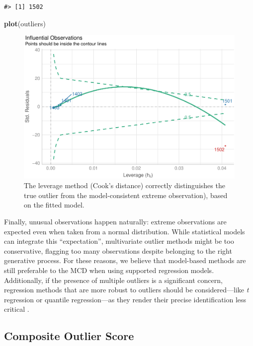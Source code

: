 \documentclass[sn-basic, lineno,pdflatex]{sn-jnl}
\newenvironment{Shaded}{\begin{snugshade}}{\end{snugshade}}
\newcommand{\FunctionTok}[1]{\textcolor[rgb]{0.13,0.29,0.53}{\textbf{#1}}}
\newcommand{\NormalTok}[1]{#1}
\begin{document}
\begin{verbatim}
#> [1] 1502
\end{verbatim}

\begin{Shaded}
\begin{Highlighting}[]
\FunctionTok{plot}\NormalTok{(outliers)}
\end{Highlighting}
\end{Shaded}

\begin{figure}
\includegraphics[width=1\linewidth]{paper_files/figure-latex/model3-1} \caption{The leverage method (Cook's distance) correctly distinguishes the true outlier from the model-consistent extreme observation), based on the fitted model.}\label{fig:model3}
\end{figure}

Finally, unusual observations happen naturally: extreme observations are
expected even when taken from a normal distribution. While statistical
models can integrate this ``expectation'', multivariate outlier methods
might be too conservative, flagging too many observations despite
belonging to the right generative process. For these reasons, we believe
that model-based methods are still preferable to the MCD when using
supported regression models. Additionally, if the presence of multiple
outliers is a significant concern, regression methods that are more
robust to outliers should be considered---like \emph{t} regression or
quantile regression---as they render their precise identification less
critical \citep{mcelreath2020statistical}.

\hypertarget{composite-outlier-score}{%
\subsection{Composite Outlier Score}\label{composite-outlier-score}}
\end{document}
